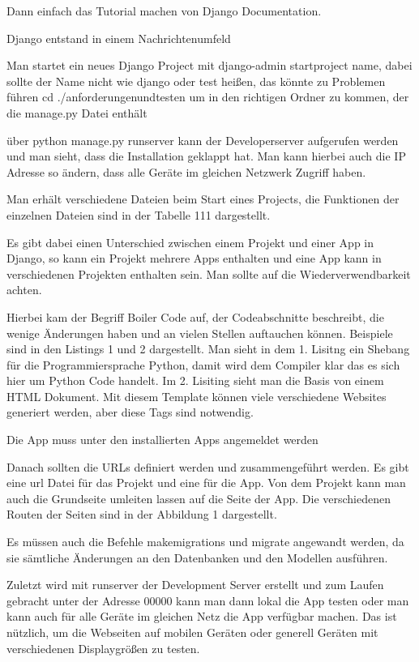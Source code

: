 \documentclass[11pt,a4paper]{report}
\begin{document}
Dann einfach das Tutorial machen von Django Documentation.

Django entstand in einem Nachrichtenumfeld

Man startet ein neues Django Project mit django-admin startproject name, dabei sollte der Name nicht wie django oder test heißen, das könnte zu Problemen führen
cd ./anforderungenundtesten um in den richtigen Ordner zu kommen, der die manage.py Datei enthält

über python manage.py runserver kann der Developerserver aufgerufen werden und man sieht, dass die Installation geklappt hat. Man kann hierbei auch die IP Adresse so ändern, dass alle Geräte im gleichen Netzwerk Zugriff haben.

Man erhält verschiedene Dateien beim Start eines Projects, die Funktionen der einzelnen Dateien sind in der Tabelle 111 dargestellt. 


Es gibt dabei einen Unterschied zwischen einem Projekt und einer App in Django, so kann ein Projekt mehrere Apps enthalten und eine App kann in verschiedenen Projekten enthalten sein. Man sollte auf die Wiederverwendbarkeit achten.

Hierbei kam der Begriff Boiler Code auf, der Codeabschnitte beschreibt, die wenige Änderungen haben und an vielen Stellen auftauchen können. Beispiele sind in den Listings 1 und 2 dargestellt. Man sieht in dem 1. Lisitng ein Shebang für die Programmiersprache Python, damit wird dem Compiler klar das es sich hier um Python Code handelt. Im 2. Lisiting sieht man die Basis von einem HTML Dokument. Mit diesem Template können viele verschiedene Websites generiert werden, aber diese Tags sind notwendig. %

Die App muss unter den installierten Apps angemeldet werden


Danach sollten die URLs definiert werden und zusammengeführt werden. Es gibt eine url Datei für das Projekt und eine für die App. Von dem Projekt kann man auch die Grundseite umleiten lassen auf die Seite der App. Die verschiedenen Routen der Seiten sind in der Abbildung 1 dargestellt. 

Es müssen auch die Befehle makemigrations und migrate angewandt werden, da sie sämtliche Änderungen an den Datenbanken und den Modellen ausführen. 

Zuletzt wird mit runserver der Development Server erstellt und zum Laufen gebracht unter der Adresse 00000 kann man dann lokal die App testen oder man kann auch für alle Geräte im gleichen Netz die App verfügbar machen. Das ist nützlich, um die Webseiten auf mobilen Geräten oder generell Geräten mit verschiedenen Displaygrößen zu testen.
\end{document}
